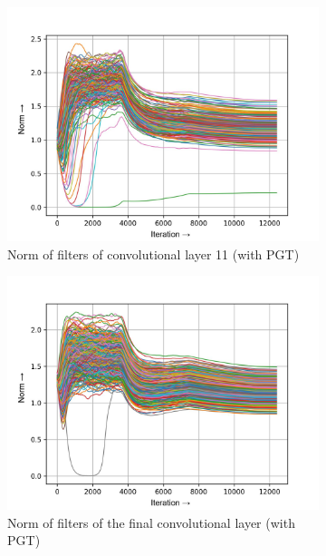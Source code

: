 \documentclass[times,sort&compress]{elsarticle}
\begin{document}
\begin{figure}[t]
\begin{subfigure}[t]{0.33\textwidth}
\includegraphics[width=\textwidth]{pgt-w-layer-4-2}
\caption{Norm of filters of convolutional layer 11 (with PGT)}
\end{subfigure}
\begin{subfigure}[t]{0.33\textwidth}
\includegraphics[width=\textwidth]{pgt-w-layer-7-2}
\caption{Norm of filters of the final convolutional layer (with PGT)}
\end{subfigure}
\begin{subfigure}[t]{0.33\textwidth}

\end{subfigure}
\end{figure}
\end{document}
